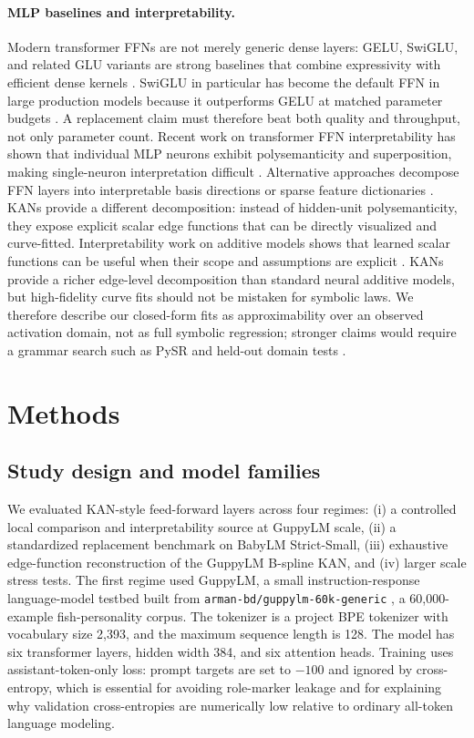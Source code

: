\documentclass{article}
\begin{document}
\paragraph{MLP baselines and interpretability.}
Modern transformer FFNs are not merely generic dense layers: GELU, SwiGLU, and related GLU variants are strong baselines that combine expressivity with efficient dense kernels \citep{shazeer2020glu}. SwiGLU in particular has become the default FFN in large production models because it outperforms GELU at matched parameter budgets \citep{chowdhery2022palm,touvron2023llama}. A replacement claim must therefore beat both quality and throughput, not only parameter count. Recent work on transformer FFN interpretability has shown that individual MLP neurons exhibit polysemanticity and superposition, making single-neuron interpretation difficult \citep{elhage2022superposition,gurnee2023finding}. Alternative approaches decompose FFN layers into interpretable basis directions or sparse feature dictionaries \citep{cunningham2023sparse,bricken2023monosemanticity}. KANs provide a different decomposition: instead of hidden-unit polysemanticity, they expose explicit scalar edge functions that can be directly visualized and curve-fitted. Interpretability work on additive models shows that learned scalar functions can be useful when their scope and assumptions are explicit \citep{agarwal2021nam}. KANs provide a richer edge-level decomposition than standard neural additive models, but high-fidelity curve fits should not be mistaken for symbolic laws. We therefore describe our closed-form fits as approximability over an observed activation domain, not as full symbolic regression; stronger claims would require a grammar search such as PySR and held-out domain tests \citep{cranmer2023pysr}.

\section{Methods}

\subsection{Study design and model families}

We evaluated KAN-style feed-forward layers across four regimes: (i) a controlled local comparison and interpretability source at GuppyLM scale, (ii) a standardized replacement benchmark on BabyLM Strict-Small, (iii) exhaustive edge-function reconstruction of the GuppyLM B-spline KAN, and (iv) larger scale stress tests. The first regime used GuppyLM, a small instruction-response language-model testbed built from \texttt{arman-bd/guppylm-60k-generic} \citep{guppylm60k}, a 60,000-example fish-personality corpus. The tokenizer is a project BPE tokenizer with vocabulary size 2,393, and the maximum sequence length is 128. The model has six transformer layers, hidden width 384, and six attention heads. Training uses assistant-token-only loss: prompt targets are set to \(-100\) and ignored by cross-entropy, which is essential for avoiding role-marker leakage and for explaining why validation cross-entropies are numerically low relative to ordinary all-token language modeling.
\end{document}
